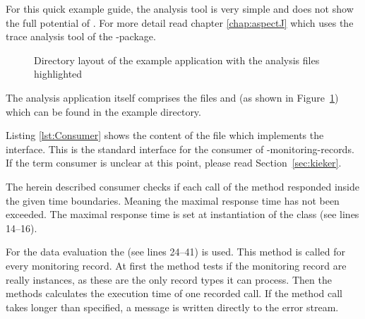 For this quick example guide, the analysis tool is very simple and does not show the full potential of \Kieker{}. For more detail read chapter \ref{chap:aspectJ} which uses the trace analysis tool of the \Kieker{}-package.

\begin{figure}[H]
\begin{graybox}
\end{graybox}
\caption{Directory layout of the example application with the analysis files highlighted}
\label{lst:analysisExampleLayout}
\end{figure}

\noindent The analysis application itself comprises the files  and  (as shown in Figure~\ref{lst:analysisExampleLayout}) which can be found in the example directory. 

Listing \ref{lst:Consumer} shows the content of the  file which implements the  interface. This is the standard interface for the consumer of \Kieker{}-monitoring-records. If the term consumer is unclear at this point, please read Section~\ref{sec:kieker}.

\setJavaCodeListing       



\noindent The herein described consumer checks if each call of the  method responded inside the given time boundaries. Meaning the maximal response time has not been exceeded. The maximal response time is set at instantiation of the  class (see lines 14--16). 

For the data evaluation the  (see lines 24--41) is used. This method is called for every monitoring record. At first the method tests if the monitoring record are really  instances, as these are the only record types it can process. Then the methods calculates the execution time of one recorded  call. If the method call takes longer than specified, a message is written directly to the error stream.

